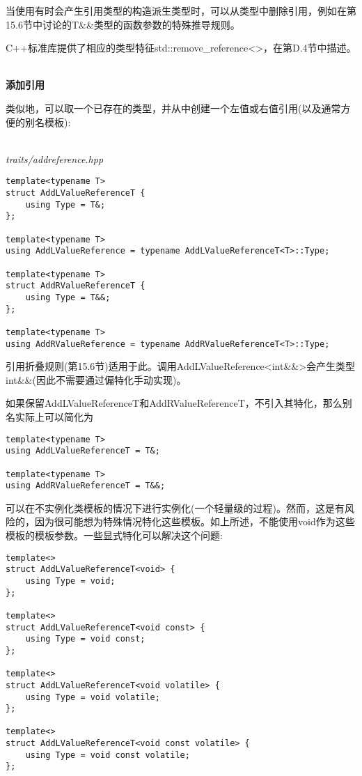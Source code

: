当使用有时会产生引用类型的构造派生类型时，可以从类型中删除引用，例如在第15.6节中讨论的T\&\&类型的函数参数的特殊推导规则。

C++标准库提供了相应的类型特征std::remove\_reference<>，在第D.4节中描述。

\hspace*{\fill} \\ %
\noindent
\textbf{添加引用}

类似地，可以取一个已存在的类型，并从中创建一个左值或右值引用(以及通常方便的别名模板):

\hspace*{\fill} \\ %
\noindent
\textit{traits/addreference.hpp}
\begin{lstlisting}[style=styleCXX]
template<typename T>
struct AddLValueReferenceT {
	using Type = T&;
};

template<typename T>
using AddLValueReference = typename AddLValueReferenceT<T>::Type;

template<typename T>
struct AddRValueReferenceT {
	using Type = T&&;
};

template<typename T>
using AddRValueReference = typename AddRValueReferenceT<T>::Type;
\end{lstlisting}

引用折叠规则(第15.6节)适用于此。调用AddLValueReference<int\&\&>会产生类型int\&\&(因此不需要通过偏特化手动实现)。

如果保留AddLValueReferenceT和AddRValueReferenceT，不引入其特化，那么别名实际上可以简化为

\begin{lstlisting}[style=styleCXX]
template<typename T>
using AddLValueReferenceT = T&;

template<typename T>
using AddRValueReferenceT = T&&;
\end{lstlisting}

可以在不实例化类模板的情况下进行实例化(一个轻量级的过程)。然而，这是有风险的，因为很可能想为特殊情况特化这些模板。如上所述，不能使用void作为这些模板的模板参数。一些显式特化可以解决这个问题:

\begin{lstlisting}[style=styleCXX]
template<>
struct AddLValueReferenceT<void> {
	using Type = void;
};

template<>
struct AddLValueReferenceT<void const> {
	using Type = void const;
};

template<>
struct AddLValueReferenceT<void volatile> {
	using Type = void volatile;
};

template<>
struct AddLValueReferenceT<void const volatile> {
	using Type = void const volatile;
};
\end{lstlisting}

